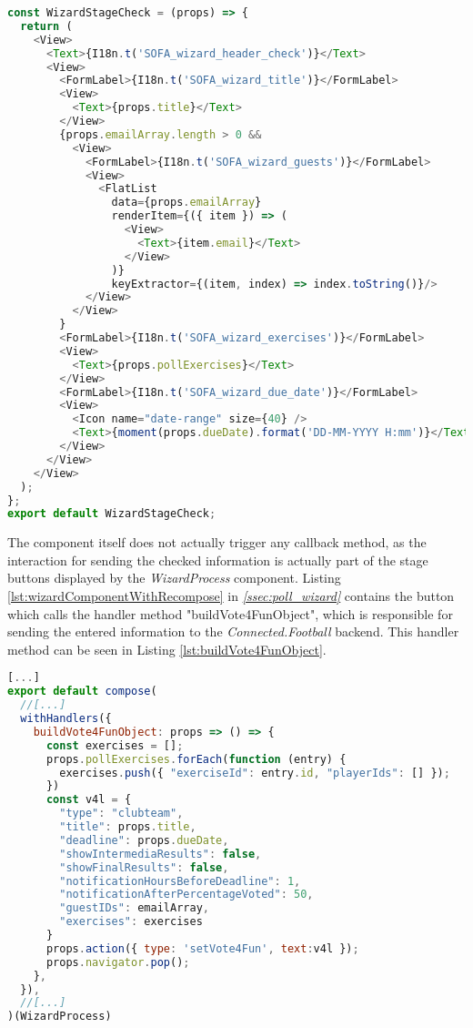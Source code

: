 \begin{lstlisting}[language=javascript,caption=Simplified Poll Check Component,label=lst:pollCheckComponent]
const WizardStageCheck = (props) => {
  return (
    <View>
      <Text>{I18n.t('SOFA_wizard_header_check')}</Text>
      <View>
        <FormLabel>{I18n.t('SOFA_wizard_title')}</FormLabel>
        <View>
          <Text>{props.title}</Text>
        </View>
        {props.emailArray.length > 0 &&
          <View>
            <FormLabel>{I18n.t('SOFA_wizard_guests')}</FormLabel>
            <View>
              <FlatList
                data={props.emailArray}
                renderItem={({ item }) => (
                  <View>
                    <Text>{item.email}</Text>
                  </View>
                )}
                keyExtractor={(item, index) => index.toString()}/>
            </View>
          </View>
        }
        <FormLabel>{I18n.t('SOFA_wizard_exercises')}</FormLabel>
        <View>
          <Text>{props.pollExercises}</Text>
        </View>
        <FormLabel>{I18n.t('SOFA_wizard_due_date')}</FormLabel>
        <View>
          <Icon name="date-range" size={40} />
          <Text>{moment(props.dueDate).format('DD-MM-YYYY H:mm')}</Text>
        </View>
      </View>
    </View>
  );
};
export default WizardStageCheck;
\end{lstlisting}

The component itself does not actually trigger any callback method, as the interaction for sending the checked information is actually part of the stage buttons displayed by the \textit{WizardProcess} component. Listing \ref{lst:wizardComponentWithRecompose} in \textit{\ref{ssec:poll_wizard} } contains the button which calls the handler method "buildVote4FunObject", which is responsible for sending the entered information to the \textit{Connected.Football} backend. This handler method can be seen in Listing \ref{lst:buildVote4FunObject}.

\begin{lstlisting}[language=javascript,caption=\textit{buildVote4FunObject} Handler Method,label=lst:buildVote4FunObject]
[...]
export default compose(
  //[...]
  withHandlers({
    buildVote4FunObject: props => () => {
      const exercises = [];
      props.pollExercises.forEach(function (entry) {
        exercises.push({ "exerciseId": entry.id, "playerIds": [] });
      })
      const v4l = {
        "type": "clubteam",
        "title": props.title,
        "deadline": props.dueDate,
        "showIntermediaResults": false,
        "showFinalResults": false,
        "notificationHoursBeforeDeadline": 1,
        "notificationAfterPercentageVoted": 50,
        "guestIDs": emailArray,
        "exercises": exercises
      }
      props.action({ type: 'setVote4Fun', text:v4l });
      props.navigator.pop();
    },
  }),
  //[...]
)(WizardProcess)
\end{lstlisting}

